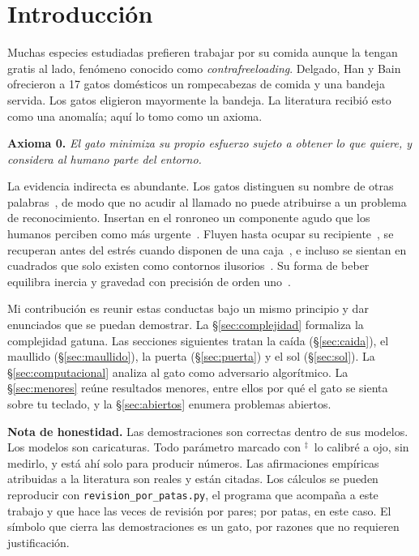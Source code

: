 \documentclass[11pt,a4paper]{article}
\theoremstyle{plain}
\theoremstyle{definition}
\theoremstyle{remark}
\numberwithin{equation}{section}
\newcommand{\calib}{{\ensuremath{^{\ddagger}}}}
\begin{document}
\section{Introducción}

Muchas especies estudiadas prefieren trabajar por su comida aunque la tengan gratis al lado, fenómeno conocido como \emph{contrafreeloading}. Delgado, Han y Bain~\cite{delgado} ofrecieron a 17 gatos domésticos un rompecabezas de comida y una bandeja servida. Los gatos eligieron mayormente la bandeja. La literatura recibió esto como una anomalía; aquí lo tomo como un axioma.

\medskip
\noindent\textbf{Axioma 0.} \emph{El gato minimiza su propio esfuerzo sujeto a obtener lo que quiere, y considera al humano parte del entorno.}

\medskip
La evidencia indirecta es abundante. Los gatos distinguen su nombre de otras palabras~\cite{saito}, de modo que no acudir al llamado no puede atribuirse a un problema de reconocimiento. Insertan en el ronroneo un componente agudo que los humanos perciben como más urgente~\cite{mccomb}. Fluyen hasta ocupar su recipiente~\cite{fardin}, se recuperan antes del estrés cuando disponen de una caja~\cite{vinke}, e incluso se sientan en cuadrados que solo existen como contornos ilusorios~\cite{smith}. Su forma de beber equilibra inercia y gravedad con precisión de orden uno~\cite{reis}.

Mi contribución es reunir estas conductas bajo un mismo principio y dar enunciados que se puedan demostrar. La \S\ref{sec:complejidad} formaliza la complejidad gatuna. Las secciones siguientes tratan la caída (\S\ref{sec:caida}), el maullido (\S\ref{sec:maullido}), la puerta (\S\ref{sec:puerta}) y el sol (\S\ref{sec:sol}). La \S\ref{sec:computacional} analiza al gato como adversario algorítmico. La \S\ref{sec:menores} reúne resultados menores, entre ellos por qué el gato se sienta sobre tu teclado, y la \S\ref{sec:abiertos} enumera problemas abiertos.

\medskip
\noindent\textbf{Nota de honestidad.} Las demostraciones son correctas dentro de sus modelos. Los modelos son caricaturas. Todo parámetro marcado con \calib\ lo calibré a ojo, sin medirlo, y está ahí solo para producir números. Las afirmaciones empíricas atribuidas a la literatura son reales y están citadas. Los cálculos se pueden reproducir con \texttt{revision\_por\_patas.py}, el programa que acompaña a este trabajo y que hace las veces de revisión por pares; por patas, en este caso. El símbolo que cierra las demostraciones es un gato, por razones que no requieren justificación.
\end{document}
